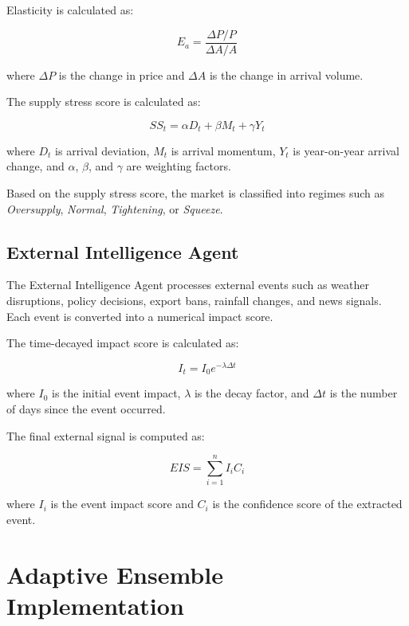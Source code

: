 \documentclass[12pt,a4paper]{report}
\begin{document}
Elasticity is calculated as:

\begin{equation}
E_a = \frac{\Delta P / P}{\Delta A / A}
\end{equation}

where $\Delta P$ is the change in price and $\Delta A$ is the change in arrival volume.

The supply stress score is calculated as:

\begin{equation}
SS_t = \alpha D_t + \beta M_t + \gamma Y_t
\end{equation}

where $D_t$ is arrival deviation, $M_t$ is arrival momentum, $Y_t$ is year-on-year arrival change, and $\alpha$, $\beta$, and $\gamma$ are weighting factors.

Based on the supply stress score, the market is classified into regimes such as \textit{Oversupply}, \textit{Normal}, \textit{Tightening}, or \textit{Squeeze}.

\subsection{External Intelligence Agent}

The External Intelligence Agent processes external events such as weather disruptions, policy decisions, export bans, rainfall changes, and news signals. Each event is converted into a numerical impact score.

The time-decayed impact score is calculated as:

\begin{equation}
I_t = I_0 e^{-\lambda \Delta t}
\end{equation}

where $I_0$ is the initial event impact, $\lambda$ is the decay factor, and $\Delta t$ is the number of days since the event occurred.

The final external signal is computed as:

\begin{equation}
EIS = \sum_{i=1}^{n} I_i C_i
\end{equation}

where $I_i$ is the event impact score and $C_i$ is the confidence score of the extracted event.

\section{Adaptive Ensemble Implementation}
\end{document}

